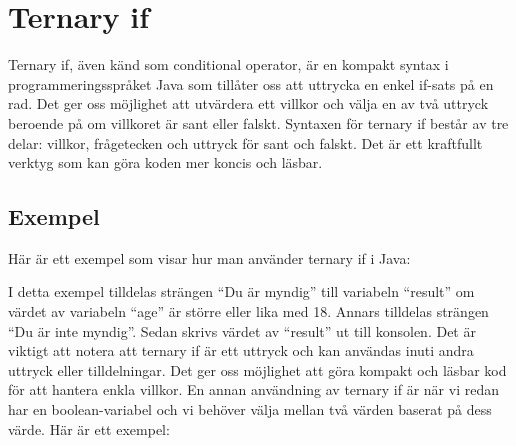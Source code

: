 \hypertarget{ternary-if}{%
\section{Ternary if}\label{ternary-if}}

Ternary if, även känd som conditional operator, är en kompakt syntax i
programmeringsspråket Java som tillåter oss att uttrycka en enkel
if-sats på en rad. Det ger oss möjlighet att utvärdera ett villkor och
välja en av två uttryck beroende på om villkoret är sant eller falskt.
Syntaxen för ternary if består av tre delar: villkor, frågetecken och
uttryck för sant och falskt. Det är ett kraftfullt verktyg som kan göra
koden mer koncis och läsbar.

\hypertarget{exempel}{%
\subsection{Exempel}\label{exempel}}

Här är ett exempel som visar hur man använder ternary if i Java:

\hypertarget{cb1}{}
\begin{Shaded}
\begin{Highlighting}[]
\OperatorTok{=} \OperatorTok{;}
\OperatorTok{=}\OperatorTok{\textgreater{}=}    \OperatorTok{:} \OperatorTok{;}
\OperatorTok{(}\OperatorTok{);}
\end{Highlighting}
\end{Shaded}

I detta exempel tilldelas strängen ``Du är myndig'' till variabeln
``result'' om värdet av variabeln ``age'' är större eller lika med 18.
Annars tilldelas strängen ``Du är inte myndig''. Sedan skrivs värdet av
``result'' ut till konsolen. Det är viktigt att notera att ternary if är
ett uttryck och kan användas inuti andra uttryck eller tilldelningar.
Det ger oss möjlighet att göra kompakt och läsbar kod för att hantera
enkla villkor. En annan användning av ternary if är när vi redan har en
boolean-variabel och vi behöver välja mellan två värden baserat på dess
värde. Här är ett exempel:

\hypertarget{cb2}{}
\begin{Shaded}
\begin{Highlighting}[]
\OperatorTok{=} \OperatorTok{;}
\OperatorTok{=}  \OperatorTok{:} \OperatorTok{;}
\end{Highlighting}
\end{Shaded}

